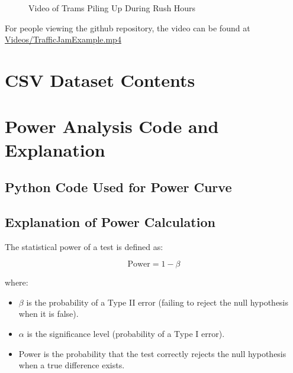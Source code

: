 \documentclass[a4paper, 10pt]{article}
\begin{document}
			\begin{figure}[h!]
				\centering
				\href{https://drive.google.com/file/d/1AP8paQ4_8Nq_sWk3bwK2iN4rS0Kls3_g/view?usp=sharing}{}
				\caption{Video of Trams Piling Up During Rush Hours}
				\label{fig:video_of_trams_piling_up}
			\end{figure}

			\noindent For people viewing the github repository, the video can be found at \href{https://github.com/EmreArapcicUevak/StatisticalModelingProjectReport/blob/main/Videos/TrafficJamExample.mp4}{Videos/TrafficJamExample.mp4}
	\newpage
	\begin{appendices}
		\section{CSV Dataset Contents}
		\label{sec:rawdata}
		

		\newpage
		\section{Power Analysis Code and Explanation}
		\label{sec:power_analysis}

		\subsection*{Python Code Used for Power Curve}
				

			\subsection*{Explanation of Power Calculation}

				The statistical power of a test is defined as:

				\[
				\text{Power} = 1 - \beta
				\]

				where:
				\begin{itemize}
						\item \( \beta \) is the probability of a Type II error (failing to reject the null hypothesis when it is false).
						\item \( \alpha \) is the significance level (probability of a Type I error).
						\item Power is the probability that the test correctly rejects the null hypothesis when a true difference exists.
				\end{itemize}


\end{appendices}
\end{document}
